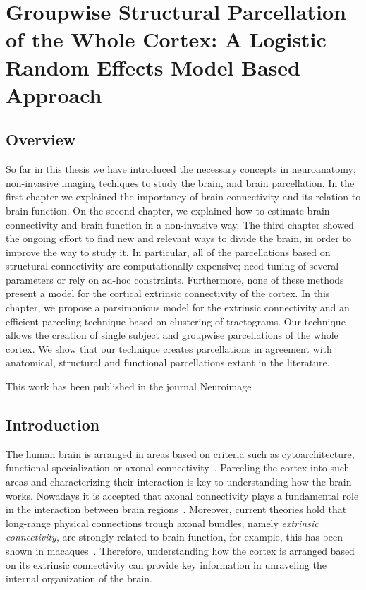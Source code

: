 \chapter{Groupwise Structural Parcellation of the Whole Cortex: A Logistic Random Effects Model Based Approach}
%
%
\section{Overview}
So far in this thesis we have introduced the necessary concepts in neuroanatomy;
non-invasive imaging techiques to study the brain, and brain parcellation. In
the first chapter we explained the importancy of brain connectivity and its
relation to brain function. On the second chapter, we explained how to estimate
brain connectivity and brain function in a non-invasive way. The third chapter
showed the ongoing effort to find new and relevant ways to divide the brain,
in order to improve the way to study it. In particular, all of the parcellations
based on structural connectivity are computationally expensive; need tuning of
several parameters or rely on ad-hoc constraints. Furthermore, none of these 
methods present a model for the cortical extrinsic connectivity of the cortex.
In this chapter, we propose a parsimonious model for the extrinsic connectivity
and an efficient parceling technique based on clustering of tractograms. 
Our technique allows the creation of single subject and groupwise parcellations
of the whole cortex. We show that our technique creates parcellations in
agreement with anatomical, structural and functional parcellations extant in 
the literature.

This work has been published in the journal Neuroimage \cite{Gallardo2017}
%
\section{Introduction}
%
The human brain is arranged in areas based on criteria such as cytoarchitecture,
functional specialization or axonal connectivity~\citep{Brodmann1909, Thirion2014,
ThiebautdeSchotten2016}. Parceling the cortex into such areas and 
characterizing their interaction is key to understanding how the brain works.
Nowadays it is accepted that axonal connectivity plays a fundamental role in the
interaction between brain regions~\citep{Schmahmann2006}. Moreover, current theories
hold that long-range physical connections trough axonal bundles,
namely \textit{extrinsic connectivity}, are strongly related to brain function, for example,
this has been shown in macaques~\citep{Passingham2002}. Therefore, understanding
how the cortex is arranged based on its extrinsic connectivity can
provide key information in unraveling the internal organization of the brain.

